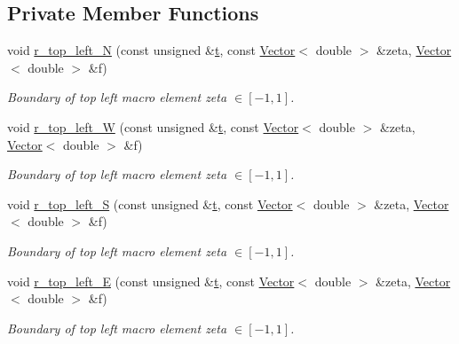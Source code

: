 \subsection*{Private Member Functions}
\begin{DoxyCompactItemize}
\item 
void \hyperlink{classoomph_1_1QuarterCircleSectorDomain_af1520e712b46c8e1b0f098596fa63101}{r\+\_\+top\+\_\+left\+\_\+N} (const unsigned \&\hyperlink{cfortran_8h_af6f0bd3dc13317f895c91323c25c2b8f}{t}, const \hyperlink{classoomph_1_1Vector}{Vector}$<$ double $>$ \&zeta, \hyperlink{classoomph_1_1Vector}{Vector}$<$ double $>$ \&f)
\begin{DoxyCompactList}\small\item\em Boundary of top left macro element zeta $ \in [-1,1] $. \end{DoxyCompactList}\item 
void \hyperlink{classoomph_1_1QuarterCircleSectorDomain_a84f4970adc3a93392ef1a57f19df96a1}{r\+\_\+top\+\_\+left\+\_\+W} (const unsigned \&\hyperlink{cfortran_8h_af6f0bd3dc13317f895c91323c25c2b8f}{t}, const \hyperlink{classoomph_1_1Vector}{Vector}$<$ double $>$ \&zeta, \hyperlink{classoomph_1_1Vector}{Vector}$<$ double $>$ \&f)
\begin{DoxyCompactList}\small\item\em Boundary of top left macro element zeta $ \in [-1,1] $. \end{DoxyCompactList}\item 
void \hyperlink{classoomph_1_1QuarterCircleSectorDomain_a0bb74af9c782bd0a0a8d3ccfd708af55}{r\+\_\+top\+\_\+left\+\_\+S} (const unsigned \&\hyperlink{cfortran_8h_af6f0bd3dc13317f895c91323c25c2b8f}{t}, const \hyperlink{classoomph_1_1Vector}{Vector}$<$ double $>$ \&zeta, \hyperlink{classoomph_1_1Vector}{Vector}$<$ double $>$ \&f)
\begin{DoxyCompactList}\small\item\em Boundary of top left macro element zeta $ \in [-1,1] $. \end{DoxyCompactList}\item 
void \hyperlink{classoomph_1_1QuarterCircleSectorDomain_a951bc38c7e96a40f33c60b3ccee820bf}{r\+\_\+top\+\_\+left\+\_\+E} (const unsigned \&\hyperlink{cfortran_8h_af6f0bd3dc13317f895c91323c25c2b8f}{t}, const \hyperlink{classoomph_1_1Vector}{Vector}$<$ double $>$ \&zeta, \hyperlink{classoomph_1_1Vector}{Vector}$<$ double $>$ \&f)
\begin{DoxyCompactList}\small\item\em Boundary of top left macro element zeta $ \in [-1,1] $. \end{DoxyCompactList}\item 

\end{DoxyCompactItemize}
